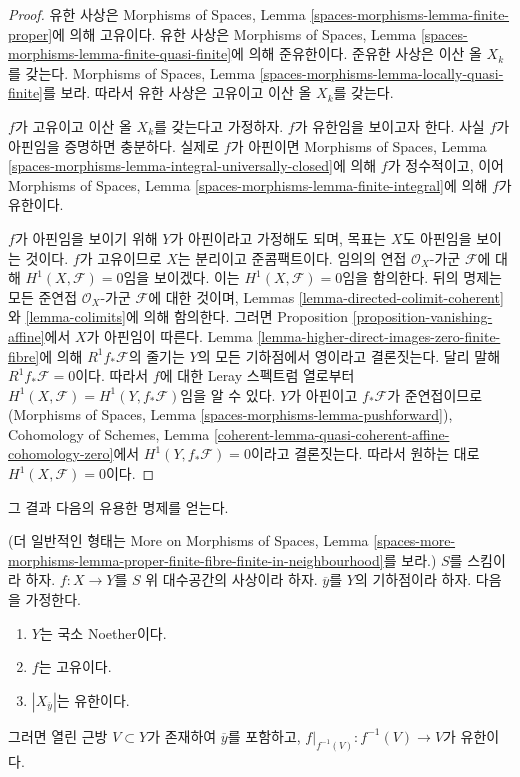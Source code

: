 \begin{proof}
유한 사상은 Morphisms of Spaces, Lemma
\ref{spaces-morphisms-lemma-finite-proper}에 의해 고유이다. 유한
사상은 Morphisms of Spaces, Lemma
\ref{spaces-morphisms-lemma-finite-quasi-finite}에 의해 준유한이다.
준유한 사상은 이산 올 $X_k$를 갖는다. Morphisms of Spaces, Lemma
\ref{spaces-morphisms-lemma-locally-quasi-finite}를 보라. 따라서
유한 사상은 고유이고 이산 올 $X_k$를 갖는다.

\medskip\noindent
$f$가 고유이고 이산 올 $X_k$를 갖는다고 가정하자. $f$가 유한임을
보이고자 한다. 사실 $f$가 아핀임을 증명하면 충분하다. 실제로
$f$가 아핀이면 Morphisms of Spaces, Lemma
\ref{spaces-morphisms-lemma-integral-universally-closed}에 의해
$f$가 정수적이고, 이어 Morphisms of Spaces, Lemma
\ref{spaces-morphisms-lemma-finite-integral}에 의해 $f$가 유한이다.

\medskip\noindent
$f$가 아핀임을 보이기 위해 $Y$가 아핀이라고 가정해도 되며, 목표는
$X$도 아핀임을 보이는 것이다. $f$가 고유이므로 $X$는 분리이고
준콤팩트이다. 임의의 연접 $\mathcal{O}_X$-가군 $\mathcal{F}$에 대해
$H^1(X, \mathcal{F}) = 0$임을 보이겠다. 이는
$H^1(X, \mathcal{F}) = 0$임을 함의한다. 뒤의 명제는 모든 준연접
$\mathcal{O}_X$-가군 $\mathcal{F}$에 대한 것이며, Lemmas
\ref{lemma-directed-colimit-coherent}와 \ref{lemma-colimits}에 의해
함의한다. 그러면 Proposition \ref{proposition-vanishing-affine}에서
$X$가 아핀임이 따른다. Lemma
\ref{lemma-higher-direct-images-zero-finite-fibre}에 의해
$R^1f_*\mathcal{F}$의 줄기는 $Y$의 모든 기하점에서 영이라고
결론짓는다. 달리 말해 $R^1f_*\mathcal{F} = 0$이다. 따라서 $f$에
대한 Leray 스펙트럼 열로부터
$H^1(X , \mathcal{F}) = H^1(Y, f_*\mathcal{F})$임을 알 수 있다.
$Y$가 아핀이고 $f_*\mathcal{F}$가 준연접이므로(Morphisms of Spaces,
Lemma \ref{spaces-morphisms-lemma-pushforward}), Cohomology of
Schemes, Lemma
\ref{coherent-lemma-quasi-coherent-affine-cohomology-zero}에서
$H^1(Y, f_*\mathcal{F}) = 0$이라고 결론짓는다. 따라서 원하는 대로
$H^1(X, \mathcal{F}) = 0$이다.
\end{proof}

\noindent
그 결과 다음의 유용한 명제를 얻는다.

\begin{lemma}
\label{lemma-proper-finite-fibre-finite-in-neighbourhood}
(더 일반적인 형태는 More on Morphisms of Spaces, Lemma
\ref{spaces-more-morphisms-lemma-proper-finite-fibre-finite-in-neighbourhood}를
보라.) $S$를 스킴이라 하자. $f : X \to Y$를 $S$ 위 대수공간의
사상이라 하자. $\overline{y}$를 $Y$의 기하점이라 하자. 다음을
가정한다.
\begin{enumerate}
\item $Y$는 국소 Noether이다.
\item $f$는 고유이다.
\item $|X_{\overline{y}}|$는 유한이다.
\end{enumerate}
그러면 열린 근방 $V \subset Y$가 존재하여 $\overline{y}$를 포함하고,
$f|_{f^{-1}(V)} : f^{-1}(V) \to V$가 유한이다.
\end{lemma}

